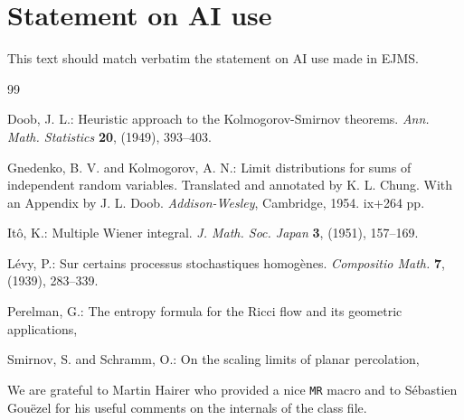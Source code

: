 \documentclass[ECP]{ejpecp} %
\begin{document}
\section*{Statement on AI use}
This text should match verbatim the statement on AI use made in EJMS.

%
%


\begin{thebibliography}{99}

 Doob, J. L.: Heuristic approach to the Kolmogorov-Smirnov
  theorems. \emph{Ann. Math. Statistics} \textbf{20}, (1949), 393--403.

 Gnedenko, B. V. and Kolmogorov, A. N.: Limit distributions for
  sums of independent random variables. Translated and annotated by K. L.
  Chung. With an Appendix by J. L. Doob. \emph{Addison-Wesley}, Cambridge,
  1954. ix+264 pp. 

 It\^o, K.: Multiple Wiener integral. \emph{J. Math. Soc. Japan}
  \textbf{3}, (1951), 157--169. 

 L\'evy, P.: Sur certains processus stochastiques homog\`enes.
  \emph{Compositio Math.} \textbf{7}, (1939), 283--339. 

 Perelman, G.: The entropy formula for the Ricci flow and its
  geometric applications, 

 Smirnov, S. and Schramm, O.: On the scaling limits of planar
  percolation, 

\end{thebibliography}

\begin{acks}
We are grateful to Martin Hairer who provided a nice \texttt{MR} macro and to S\'ebastien Gou\"ezel for his useful comments on the internals of the class file.
\end{acks}


\end{document}
